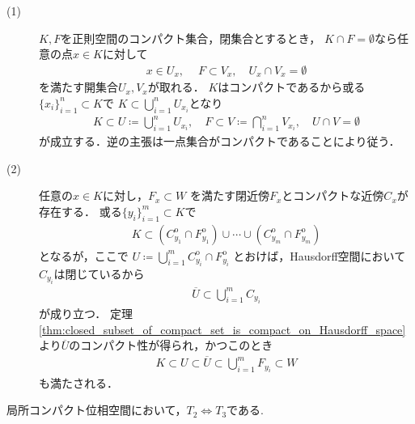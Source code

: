 	\begin{prf}\mbox{}
		\begin{description}
			\item[(1)]
				$K,F$を正則空間のコンパクト集合，閉集合とするとき，
				$K \cap F = \emptyset$なら任意の点$x \in K$に対して
				\begin{align}
					x \in U_x,\ \quad F \subset V_x,
					\quad U_x \cap V_x = \emptyset
				\end{align}
				を満たす開集合$U_x,V_x$が取れる．
				$K$はコンパクトであるから或る$\{x_i\}_{i=1}^n \subset K$で
				$K \subset \bigcup_{i=1}^n U_{x_i}$となり
				\begin{align}
					K \subset U \coloneqq \bigcup_{i=1}^n U_{x_i},
					\quad F \subset V \coloneqq \bigcap_{i=1}^n V_{x_i},
					\quad U \cap V = \emptyset
				\end{align}
				が成立する．逆の主張は一点集合がコンパクトであることにより従う．
			\item[(2)]
				任意の$x \in K$に対し，$F_x \subset W$
				を満たす閉近傍$F_x$とコンパクトな近傍$C_x$が存在する．
				或る$\{y_i\}_{i=1}^m \subset K$で
				\begin{align}
					K \subset 
					\left(C_{y_1}^{\mathrm{o}} \cap F_{y_1}^{\mathrm{o}}\right) 
					\cup \cdots \cup 
					\left(C_{y_m}^{\mathrm{o}} \cap F_{y_m}^{\mathrm{o}}\right)
				\end{align}
				となるが，ここで
				$U \coloneqq 
				\bigcup_{i=1}^m C_{y_i}^{\mathrm{o}} \cap F_{y_i}^{\mathrm{o}}$
				とおけば，Hausdorff空間において$C_{y_i}$は閉じているから
				\begin{align}
					\overline{U} \subset \bigcup_{i=1}^m C_{y_i}
				\end{align}
				が成り立つ．
				定理\ref{thm:closed_subset_of_compact_set_is_compact_on_Hausdorff_space}
				より$\overline{U}$のコンパクト性が得られ，かつこのとき
				\begin{align}
					K \subset U \subset \overline{U} \subset \bigcup_{i=1}^m F_{y_i}
					\subset W
				\end{align}
				も満たされる．
				\QED
		\end{description}
	\end{prf}
	
	\begin{screen}
		\begin{thm}
		\label{thm:T_2_equals_to_T_3_in_locally_compact_spaces}
			局所コンパクト位相空間において，$T_2 \Longleftrightarrow T_3$である.
		\end{thm}
	\end{screen}
	
